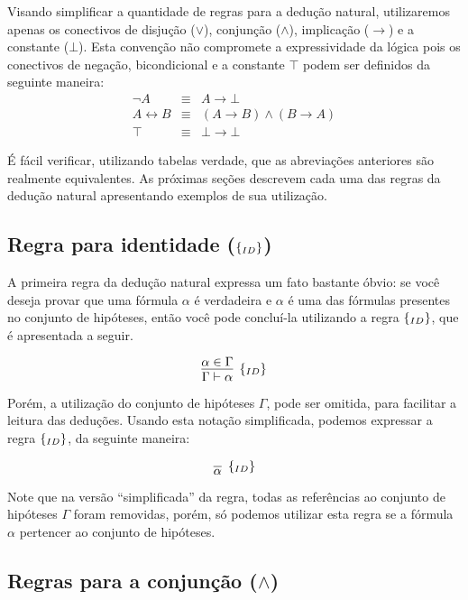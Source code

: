 Visando simplificar a quantidade de regras para a dedu\c{c}\~ao
natural, utilizaremos apenas os conectivos de disju\c{c}\~ao ($\lor$),
conjun\c{c}\~ao ($\land$), implica\c{c}\~ao ($\to$) e a constante
($\bot$). Esta conven\c{c}\~ao n\~ao compromete a expressividade da
l\'ogica pois os conectivos de nega\c{c}\~ao, bicondicional e a
constante $\top$ podem ser definidos da seguinte maneira:
\[
\begin{array}{lcl}
   \neg A & \equiv & A \to \bot \\
   A \leftrightarrow B & \equiv & (A \to B) \land (B \to A) \\
  \top   & \equiv & \bot \to \bot
\end{array}
\]

\'E f\'acil verificar, utilizando tabelas verdade, que as
abrevia\c{c}\~oes anteriores s\~ao realmente equivalentes.
As pr\'oximas se\c{c}\~oes descrevem cada uma das regras da
dedu\c{c}\~ao natural apresentando exemplos de sua utiliza\c{c}\~ao.

\subsection{Regra para identidade ($\scriptsize{\{_{ID}\}}$)}

A primeira regra da dedu\c{c}\~ao natural expressa um fato bastante
\'obvio: se voc\^e deseja provar que uma f\'ormula $\alpha$
\'e verdadeira e $\alpha$ \'e uma das f\'ormulas presentes no conjunto
de hip\'oteses, ent\~ao voc\^e pode conclu\'i-la utilizando a regra
$\scriptsize{\{_{ID}\}}$, que \'e apresentada a seguir.

\[
\infer[\Id]
         {\Gamma \vdash \alpha}
         {\alpha \in \Gamma}
\]

Por\'em, a utiliza\c{c}\~ao do conjunto de hip\'oteses $\Gamma$, pode
ser omitida, para facilitar a leitura das dedu\c{c}\~oes. Usando esta
nota\c{c}\~ao simplificada, podemos expressar a regra $\scriptsize{\{_{ID}\}}$, da
seguinte maneira:

\[
\infer[\Id]
         {\alpha}
         {}
\]

Note que na vers\~ao ``simplificada'' da regra, todas as refer\^encias
ao conjunto de hip\'oteses $\Gamma$ foram removidas, por\'em, s\'o
podemos utilizar esta regra se a f\'ormula $\alpha$ pertencer ao
conjunto de hip\'oteses.

\subsection{Regras para a conjun\c{c}\~ao ($\land$)}

